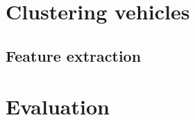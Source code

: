 \section{Clustering vehicles}\label{s.classification}

\subsection{Feature extraction}

\section{Evaluation}\label{s.results}
